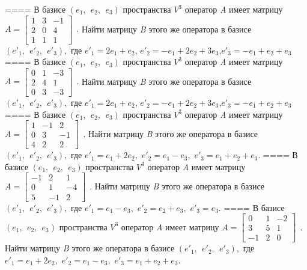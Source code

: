 ====
В базисе \((e_{1},\ \ e_{2},\ \ e_{3})\) пространства \(V^{3}\) оператор \emph{A} имеет матрицу \(A = \begin{bmatrix}
1 & 3 & - 1 \\
2 & 0 & 4 \\
1 & 1 & 1
\end{bmatrix}\ \ .\) Найти матрицу \emph{B} этого же оператора в базисе \(({e'}_{1},\ \ {e'}_{2},\ \ {e'}_{3}),\) где \({e'}_{1} = 2e_{1} + e_{2}\), \({e'}_{2} = - e_{1} + 2e_{2} + 3e_{3}\),\({e'}_{3} = - e_{1} + e_{2} + e_{3}\)
====
В базисе \((e_{1},\ \ e_{2},\ \ e_{3})\) пространства \(V^{3}\) оператор \emph{A} имеет матрицу \(A = \begin{bmatrix}
0 & 1 & - 3 \\
2 & 4 & 1 \\
0 & 3 & - 3
\end{bmatrix}\ \ .\) Найти матрицу \emph{B} этого же оператора в базисе \(({e'}_{1},\ \ {e'}_{2},\ \ {e'}_{3}),\) где \({e'}_{1} = 2e_{1} + e_{2}\), \({e'}_{2} = - e_{1} + 2e_{2} + 3e_{3}\),\({e'}_{3} = - e_{1} + e_{2} + e_{3}\)
====
В базисе \((e_{1},\ \ e_{2},\ \ e_{3})\) пространства \(V^{3}\) оператор \emph{A} имеет матрицу \(A = \begin{bmatrix}
1 & - 1 & 2 \\
0 & 3 & - 1 \\
4 & 2 & 2
\end{bmatrix}\ \ .\) Найти матрицу \emph{B} этого же оператора в базисе \(({e'}_{1},\ \ {e'}_{2},\ \ {e'}_{3}),\) где \({e'}_{1} = e_{1} + 2e_{2},\) \({e'}_{2} = e_{1} - e_{3},\) \({e'}_{3} = e_{1} + e_{2} + e_{3}.\)
====
В базисе \((e_{1},\ \ e_{2},\ \ e_{3})\) пространства \(V^{3}\) оператор \emph{A} имеет матрицу \(A = \begin{bmatrix}
 - 1 & 2 & 1 \\
0 & 1 & - 4 \\
5 & - 1 & 2
\end{bmatrix}\ \ .\) Найти матрицу \emph{B} этого же оператора в базисе \(({e'}_{1},\ \ {e'}_{2},\ \ {e'}_{3}),\) где \({e'}_{1} = e_{1} - e_{3},\) \({e'}_{2} = e_{2} + e_{3},\) \({e'}_{3} = e_{3}.\)
====
В базисе \((e_{1},\ \ e_{2},\ \ e_{3})\) пространства \(V^{3}\) оператор \emph{A} имеет матрицу \(A = \begin{bmatrix}
0 & 1 & - 2 \\
3 & 5 & 1 \\
 - 1 & 2 & 0
\end{bmatrix}\ \ .\) Найти матрицу \emph{B} этого же оператора в базисе \(({e'}_{1},\ \ {e'}_{2},\ \ {e'}_{3}),\) где \({e'}_{1} = e_{1} + 2e_{2},\) \({e'}_{2} = e_{1} - e_{3},\) \({e'}_{3} = e_{1} + e_{2} + e_{3}.\)
